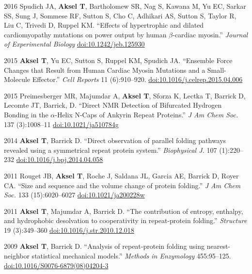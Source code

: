 \documentclass[12pt,letterpaper]{report}
\begin{document}
\begin{tablist}
        \item[2016] \tab{}Spudich JA, \textbf{Aksel T}, Bartholomew SR, Nag S, Kawana M, Yu EC, Sarkar SS, Sung J, Sommese RF, Sutton S, Cho C, Adhikari AS, Sutton S, Taylor R, Liu C, Trivedi D, Ruppel KM. \enquote{Effects of hypertrophic and dilated cardiomyopathy mutations on power output by human $\beta$-cardiac myosin.} \textit{Journal of Experimental Biology} \href{https://doi.org/10.1242/jeb.125930}{doi:10.1242/jeb.125930}

        \item[2015] \tab{}\textbf{Aksel T}, Yu EC, Sutton S, Ruppel KM, Spudich JA. \enquote{Ensemble Force Changes that Result from Human Cardiac Myosin Mutations and a Small-Molecule Effector.} \textit{Cell Reports} 11 (6):910--920. \href{https://doi.org/10.1016/j.celrep.2015.04.006}{doi:10.1016/j.celrep.2015.04.006}

        \item[2015] \tab{}Preimesberger MR, Majumdar A, \textbf{Aksel T}, Sforza K, Lectka T, Barrick D, Lecomte JT, Barrick, D. \enquote{Direct NMR Detection of Bifurcated Hydrogen Bonding in the $\alpha$-Helix N-Caps of Ankyrin Repeat Proteins.} \textit{J Am Chem Soc.} 137 (3):1008--11 \href{https://doi.org/10.1021/ja510784g}{doi:10.1021/ja510784g}

        \item[2014] \tab{}\textbf{Aksel T}, Barrick D. \enquote{Direct observation of parallel folding pathways revealed using a symmetrical repeat protein system.} \textit{Biophysical J.} 107 (1):220--232 \href{https://doi.org/10.1016/j.bpj.2014.04.058}{doi:10.1016/j.bpj.2014.04.058}

        \item[2011] \tab{}Rouget JB, \textbf{Aksel T}, Roche J, Saldana JL, Garcia AE, Barrick D, Royer CA. \enquote{Size and sequence and the volume change of protein folding.} \textit{J Am Chem Soc.} 133 (15):6020--6027 \href{https://doi.org/10.1021/ja200228w}{doi:10.1021/ja200228w}

        \item[2011] \tab{}\textbf{Aksel T}, Majumdar A, Barrick D. \enquote{The contribution of entropy, enthalpy, and hydrophobic desolvation to cooperativity in repeat-protein folding.} \textit{Structure} 19 (3):349--360 \href{https://doi.org/10.1016/j.str.2010.12.018}{doi:10.1016/j.str.2010.12.018}

        \item[2009] \tab{}\textbf{Aksel T}, Barrick D. \enquote{Analysis of repeat-protein folding using nearest-neighbor statistical mechanical models.} \textit{Methods in Enzymology} 455:95--125. \href{https://doi.org/10.1016/S0076-6879(08)04204-3}{doi:10.1016/S0076-6879(08)04204-3}

    \end{tablist}
\end{document}
